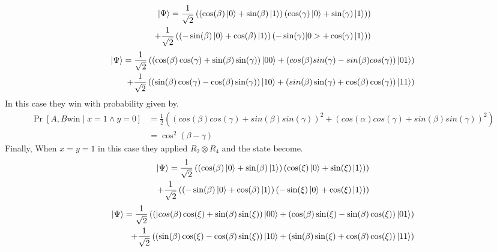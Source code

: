 \begin{equation*}
\begin{aligned}
\ket{\Psi }= \frac{1}{\sqrt{2}}\left( \left(\cos(\beta)\ket{0}+\sin(\beta)\ket{1} \right) \left(\cos(\gamma)\ket{0}+\sin(\gamma)\ket{1} \right) \right)  \\  
+  \frac{1}{\sqrt{2}} \left( \left(-\sin(\beta)\ket{0}+\cos(\beta)\ket{1} \right) \left(-\sin(\gamma)|0>+\cos(\gamma)\ket{1} \right) \right)
\end{aligned}
\end{equation*}
\begin{equation*}
\begin{aligned}
\ket{\Psi }= \frac{1}{\sqrt{2}}\left(\left(\cos(\beta) \cos(\gamma)+\sin(\beta) \sin(\gamma)\right)\ket{00}+\left( cos(\beta)  sin(\gamma)-sin(\beta)  cos(\gamma)\right)\ket{01}\right)\\
+\frac{1}{\sqrt{2}}\left( \left( \sin(\beta)  \cos(\gamma)-\cos(\beta) \sin(\gamma)\right)\ket{10}+\left(sin(\beta) \sin(\gamma)+\cos(\beta)  \cos(\gamma)\right)\ket{11}\right)
\end{aligned}
\end{equation*}
In this case they win with probability given by.
\begin{align} 
\Pr[A,B \text{win} \mid x=1 \wedge y=0]&=\frac{1}{2}\left(\left(cos(\beta) cos(\gamma)+sin(\beta)sin(\gamma)\right)^2 +\left(cos(\alpha) cos(\gamma)+sin(\beta)sin(\gamma)\right)^2  \right)\nonumber\\ 
&=\cos^2(\beta-\gamma)\label{eq4}
\end{align}
Finally, When $x=y=1$ in this case they applied $R_2\otimes R_4$ and the state become.
\begin{equation*}
\begin{aligned}
\ket{\Psi }= \frac{1}{\sqrt{2}}\left( \left(\cos(\beta)\ket{0}+\sin(\beta)\ket{1} \right) \left(\cos(\xi)\ket{0}+\sin(\xi)\ket{1} \right) \right)  \\  
+\frac{1}{\sqrt{2}} \left( \left(-\sin(\beta)\ket{0}+\cos(\beta)\ket{1} \right) \left(-\sin(\xi)\ket{0}+\cos(\xi)\ket{1} \right) \right)
\end{aligned}
\end{equation*}
\begin{equation*}
\begin{aligned}
\ket{\Psi}= \frac{1}{\sqrt{2}}\left(\left(|cos(\beta) \cos(\xi)+\sin(\beta) \sin(\xi)\right)\ket{00}+\left( \cos(\beta)  \sin(\xi)-\sin(\beta)  \cos(\xi)\right)\ket{01}\right)\\
+\frac{1}{\sqrt{2}}\left( \left( \sin(\beta)  \cos(\xi)-\cos(\beta) \sin(\xi)\right)\ket{10}+\left(\sin(\beta) \sin(\xi)+\cos(\beta)  \cos(\xi)\right)\ket{11}\right)
\end{aligned}
\end{equation*}
